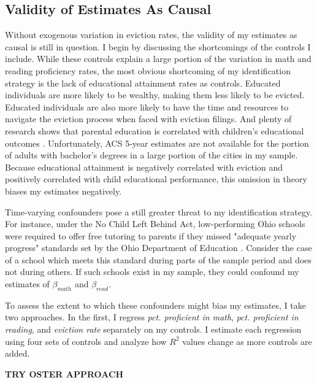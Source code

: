 \documentclass[12pt]{article}
\begin{document}
\subsection{Validity of Estimates As Causal}
Without exogenous variation in eviction rates, the validity of my estimates as causal is still in question. I begin by discussing the shortcomings of the controls I include. While these controls explain a large portion of the variation in math and reading proficiency rates, the most obvious shortcoming of my identification strategy is the lack of educational attainment rates as controls. Educated individuals are more likely to be wealthy, making them less likely to be evicted. Educated individuals are also more likely to have the time and resources to navigate the eviction process when faced with eviction filings. And plenty of research shows that parental education is correlated with children's educational outcomes \citep{havemen}. Unfortunately, ACS 5-year estimates are not available for the portion of adults with bachelor's degrees in a large portion of the cities in my sample. Because educational attainment is negatively correlated with eviction and positively correlated with child educational performance, this omission in theory biases my estimates negatively. 


Time-varying confounders pose a still greater threat to my identification strategy. For instance, under the No Child Left Behind Act, low-performing Ohio schools were required to offer free tutoring to parents if they missed "adequate yearly progress" standards set by the Ohio Department of Education \citep{klein_no_2015}. Consider the case of a school which meets this standard during parts of the sample period and does not during others. If such schools exist in my sample, they could confound my estimates of $\beta_{math}$ and $\beta_{read}$.


To assess the extent to which these confounders might bias my estimates, I take two approaches. In the first, I regress \emph{pct. proficient in math}, \emph{pct. proficient in reading}, and \emph{eviction rate} separately on my controls. I estimate each regression using four sets of controls and analyze how $R^2$ values change as more controls are added. 

\textbf{TRY OSTER APPROACH}
\end{document}
